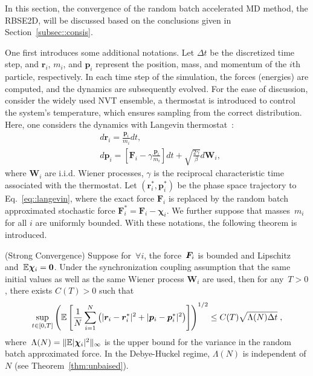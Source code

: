 In this section, the convergence of the random batch accelerated MD method, the RBSE2D, will be discussed based on the conclusions given in Section~\ref{subsec::consis}.

One first introduces some additional notations.
Let $\Delta t$ be the discretized time step, and $\bm{r}_i$, $m_i$, and $\bm{p}_i$ represent the position, mass, and momentum of the $i$th particle, respectively. 
In each time step of the simulation, the forces (energies) are computed, and the dynamics are subsequently evolved. 
For the ease of discussion, consider the widely used NVT ensemble, a thermostat is introduced to control the system's temperature, which ensures sampling from the correct distribution. 
Here, one considers the dynamics with Langevin thermostat~\cite{frenkel2023understanding}:
\begin{equation}\label{eq::langevin}
	\begin{split}
		& d \boldsymbol{r}_i = \frac{\boldsymbol{p}_i}{m_i} d t, \\ 
		& d \boldsymbol{p}_i = \left[\boldsymbol{F}_i - \gamma \frac{\boldsymbol{p}_i}{m_i}\right] d t + \sqrt{\frac{2 \gamma}{\beta}} d \boldsymbol{W}_i,
	\end{split}
\end{equation}
where $\boldsymbol{W}_i$ are i.i.d. Wiener processes, $\gamma$ is the reciprocal characteristic time associated with the thermostat.
Let $(\bm{r}_i^*, \bm{p}_i^*)$ be the phase space trajectory to Eq.~\eqref{eq::langevin}, where the exact force $\bm{F}_i$ is replaced by the random batch approximated stochastic force $\bm{F}_i^*=\bm{F}_i-\bm{\chi}_i$. We further suppose that masses~$m_{i}$ for all $i$ are uniformly bounded.
With these notations, the following theorem is introduced.
\begin{thm} (Strong Convergence)
	Suppose for~$\forall i$, the force~$\boldsymbol{F}_{i}$ is bounded and Lipschitz and~$\mathbb{E} \boldsymbol{\chi}_{i} = \bm 0$. Under the synchronization coupling assumption that the same initial values as well as the same Wiener process $\bm{W}_i$ are used, then for any~$T > 0$, there exists $C(T) > 0$ such that
	\begin{equation}\label{eq::bound}
		\sup_{t\in[0,T]}\left( \mathbb{E} \left[ \frac{1}{N} \sum_{i = 1}^N \left(\lvert\boldsymbol{r}_{i} - \boldsymbol{r}_{i}^*\rvert^2 + \lvert\boldsymbol{p}_{i} - \boldsymbol{p}_{i}^*\rvert^2\right) \right] \right)^{1/2} \leq C(T) \sqrt{\Lambda(N) \Delta t}\;,
	\end{equation}
	where~$\Lambda(N)=\|\mathbb{E} \lvert\boldsymbol{\chi}_{i}\rvert^2\|_{\infty}$ is the upper bound for the variance in the random batch approximated force. In the Debye-H$\ddot{\text{u}}$ckel regime, $\Lambda(N)$ is independent of $N$ (see Theorem~\ref{thm:unbaised}).
	\label{thm:rbm_consist}
\end{thm}

